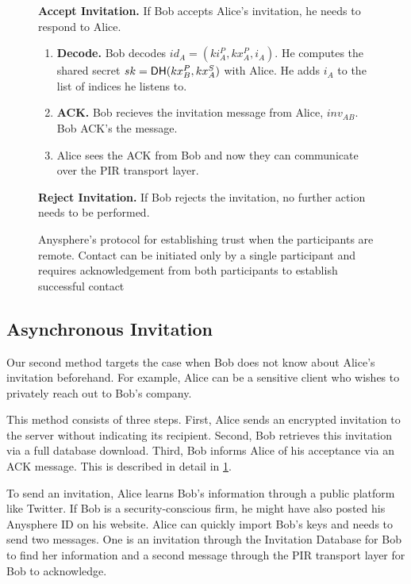 \begin{figure}[!th]
\begin{framed}
{\begin{hangparas}{1em}{1}
    \medskip

      \textbf{Accept Invitation.}
          If Bob accepts Alice's invitation, he needs to respond to Alice.
          \begin{enumerate}
              \item \textbf{Decode.} Bob decodes $id_A = (ki_A^P, kx_A^P, i_A)$. He computes the shared secret $sk =  \mathsf{DH}(kx_B^P, kx^S_A)$ with Alice. He adds $i_A$ to the list of indices he listens to.
              \item \textbf{ACK.} Bob recieves the invitation message from Alice, $inv_{AB}$. Bob ACK's the message.
              \item Alice sees the ACK from Bob and now they can communicate over the PIR transport layer.
          \end{enumerate}
    \medskip
          
      \textbf{Reject Invitation.}
        If Bob rejects the invitation, no further action needs to be performed.
  \end{hangparas}
  }
  \end{framed}
  \caption{Anysphere's protocol for establishing trust when the participants are remote. Contact can be initiated only by a single participant and requires acknowledgement from both participants to establish successful contact}
  \label{fig:trust-establishment-async}
\end{figure}


\subsection{Asynchronous Invitation}

Our second method targets the case when Bob does not know about Alice's invitation beforehand. For example, Alice can be a sensitive client who wishes to privately reach out to Bob's company. 

This method consists of three steps. First, Alice sends an encrypted invitation to the server without indicating its recipient. Second, Bob retrieves this invitation via a full database download. Third, Bob informs Alice of his acceptance via an ACK message. This is described in detail in \cref{fig:trust-establishment-async}.

To send an invitation, Alice learns Bob's information through a public platform like Twitter. If Bob is a security-conscious firm, he might have also posted his Anysphere ID on his website. Alice can quickly import Bob's keys and needs to send two messages. One is an invitation through the Invitation Database for Bob to find her information and a second message through the PIR transport layer for Bob to acknowledge.

